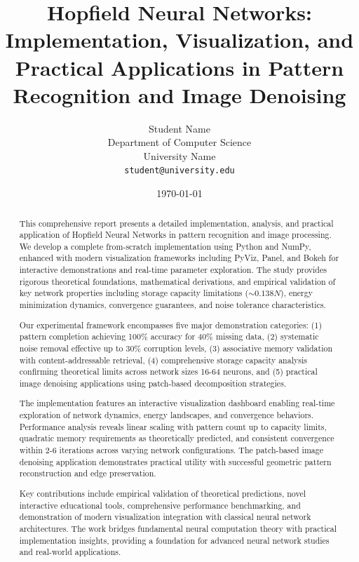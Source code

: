 \documentclass[11pt,a4paper]{article}
\title{\textbf{Hopfield Neural Networks: Implementation, Visualization, and Practical Applications in Pattern Recognition and Image Denoising}}
\author{
    Student Name\\
    Department of Computer Science\\
    University Name\\
    \texttt{student@university.edu}
}
\date{\today}
\begin{document}
\maketitle

\begin{abstract}
This comprehensive report presents a detailed implementation, analysis, and practical application of Hopfield Neural Networks in pattern recognition and image processing. We develop a complete from-scratch implementation using Python and NumPy, enhanced with modern visualization frameworks including PyViz, Panel, and Bokeh for interactive demonstrations and real-time parameter exploration. The study provides rigorous theoretical foundations, mathematical derivations, and empirical validation of key network properties including storage capacity limitations ($\sim 0.138N$), energy minimization dynamics, convergence guarantees, and noise tolerance characteristics.

Our experimental framework encompasses five major demonstration categories: (1) pattern completion achieving 100\% accuracy for 40\% missing data, (2) systematic noise removal effective up to 30\% corruption levels, (3) associative memory validation with content-addressable retrieval, (4) comprehensive storage capacity analysis confirming theoretical limits across network sizes 16-64 neurons, and (5) practical image denoising applications using patch-based decomposition strategies.

The implementation features an interactive visualization dashboard enabling real-time exploration of network dynamics, energy landscapes, and convergence behaviors. Performance analysis reveals linear scaling with pattern count up to capacity limits, quadratic memory requirements as theoretically predicted, and consistent convergence within 2-6 iterations across varying network configurations. The patch-based image denoising application demonstrates practical utility with successful geometric pattern reconstruction and edge preservation.

Key contributions include empirical validation of theoretical predictions, novel interactive educational tools, comprehensive performance benchmarking, and demonstration of modern visualization integration with classical neural network architectures. The work bridges fundamental neural computation theory with practical implementation insights, providing a foundation for advanced neural network studies and real-world applications.
\end{abstract}
\end{document}
